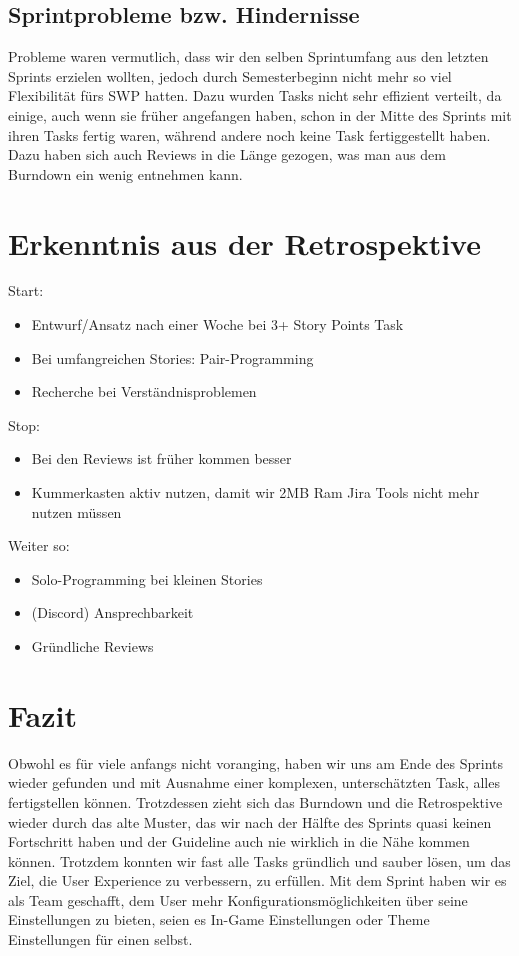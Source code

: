 \documentclass[12pt,a4paper, oneside]{article}
\begin{document}
    \subsection{Sprintprobleme bzw. Hindernisse}
    Probleme waren vermutlich, dass wir den selben Sprintumfang aus den letzten Sprints erzielen wollten, jedoch durch Semesterbeginn nicht mehr so viel Flexibilität fürs SWP hatten. Dazu wurden Tasks nicht sehr effizient verteilt, da einige, auch wenn sie früher angefangen haben, schon in der Mitte des Sprints mit ihren Tasks fertig waren, während andere noch keine Task fertiggestellt haben. Dazu haben sich auch Reviews in die Länge gezogen, was man aus dem Burndown ein wenig entnehmen kann.

    \section{Erkenntnis aus der Retrospektive}
    Start:
    \begin{itemize}
        \item Entwurf/Ansatz nach einer Woche bei 3+ Story Points Task
        \item Bei umfangreichen Stories: Pair-Programming
        \item Recherche bei Verständnisproblemen
    \end{itemize}
    Stop:
    \begin{itemize}
        \item Bei den Reviews ist früher kommen besser
        \item Kummerkasten aktiv nutzen, damit wir 2MB Ram Jira Tools nicht mehr nutzen müssen
    \end{itemize}
    Weiter so:
    \begin{itemize}
        \item Solo-Programming bei kleinen Stories
        \item (Discord) Ansprechbarkeit
        \item Gründliche Reviews
    \end{itemize}

    \section{Fazit}
    Obwohl es für viele anfangs nicht voranging, haben wir uns am Ende des Sprints wieder gefunden und mit Ausnahme einer komplexen, unterschätzten Task, alles fertigstellen können. Trotzdessen zieht sich das Burndown und die Retrospektive wieder durch das alte Muster, das wir nach der Hälfte des Sprints quasi keinen Fortschritt haben und der Guideline auch nie wirklich in die Nähe kommen können. Trotzdem konnten wir fast alle Tasks gründlich und sauber lösen, um das Ziel, die User Experience zu verbessern, zu erfüllen. Mit dem Sprint haben wir es als Team geschafft, dem User mehr Konfigurationsmöglichkeiten über seine Einstellungen zu bieten, seien es In-Game Einstellungen oder Theme Einstellungen für einen selbst.
\end{document}
